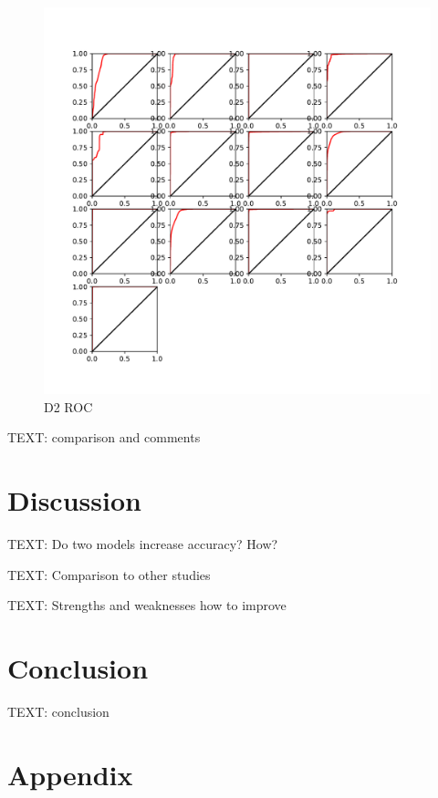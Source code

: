\documentclass{article}
\begin{document}
			\begin{figure}[htbp]
				\centering
				\includegraphics[width=\linewidth]{Figs/diagnosis2_ROC.pdf}
				\caption{D2 ROC}
				\vspace{0.3cm}
				\label{fig:D2_ROC}
			\end{figure}
			TEXT: comparison and comments
	
	\section{Discussion}
		
		TEXT: Do two models increase accuracy? How?
		
		TEXT: Comparison to other studies
		
		TEXT: Strengths and weaknesses
		how to improve
		
	\section{Conclusion}
	
		TEXT: conclusion

	\newrefcontext[sorting=nyt]
	\printbibliography
	
	\pagebreak
	\section*{Appendix}
	
\end{document}

